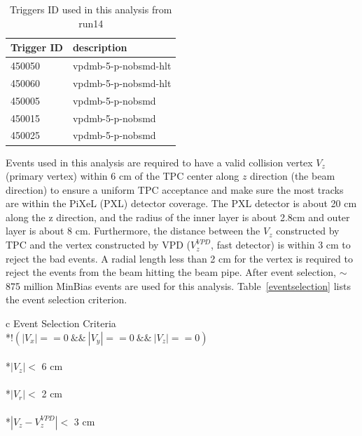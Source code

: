 \documentclass[a4paper]{article}
\begin{document}
\begin{table}[htp]
\centering
\caption{Triggers ID used in this analysis from run14}
\label{trigger}
	\begin{center}
	\begin{tabular}{l|l}
	Trigger ID	& description\\ \hline
	450050		& vpdmb-5-p-nobsmd-hlt\\ \hline
	450060		& vpdmb-5-p-nobsmd-hlt\\ \hline
	450005		& vpdmb-5-p-nobsmd\\ \hline
	450015		& vpdmb-5-p-nobsmd\\ \hline
	450025		& vpdmb-5-p-nobsmd\\ \hline
	\end{tabular}
	\end{center}
\end{table}

Events used in this analysis are required to have a valid collision vertex $V_{z}$ (primary vertex) within 6 cm of the TPC center along $z$ direction (the beam direction) to ensure a uniform TPC acceptance and make sure the most tracks are within the PiXeL (PXL) detector coverage. The PXL detector is about 20 cm along the z direction, and the radius of the inner layer is about 2.8cm and outer layer is about 8 cm. Furthermore, the distance between the $V_{z}$ constructed by TPC and the vertex constructed by VPD ($V_{z}^{VPD}$, fast detector) is within 3 cm to reject the bad events. A radial length less than 2 cm for the vertex is required to reject the events from the beam hitting the beam pipe. After event selection, $\sim$875 million MinBias events are used for this analysis. Table~\ref{eventselection} lists the event selection criterion.

\begin{table}[htp]
\centering
\caption{Event selection in Au+Au collisions at 200 GeV for $D^0$.}
\label{eventselection}
\begin{tabular}{c}
\toprule[1.6pt]
Event Selection Criteria \\
\midrule[1.2pt]
*{$!(|V_{x}|== 0 \ \&\& \ |V_{y}|== 0 \  \&\& \  |V_{z}|== 0) $ } \\
\\
*{$|V_{z}|<$ 6 cm} \\
\\
*{$|V_{r}|<$ 2 cm} \\
\\
*{$|V_{z} - V_{z}^{VPD}|<$ 3 cm} \\ 
\\  
\bottomrule[1.6pt]
\end{tabular}
\end{table}
\end{document}
